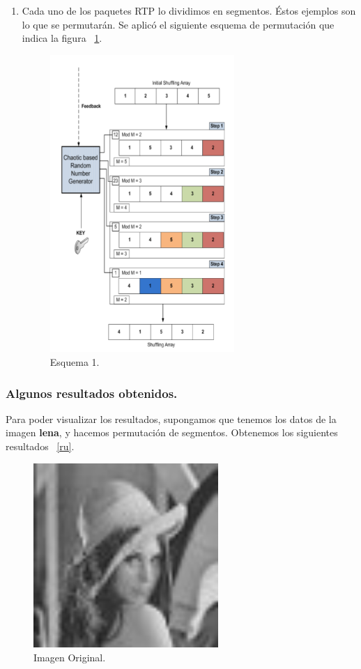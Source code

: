 \documentclass[10pt]{IEEEtran}
\begin{document}
\begin{enumerate}
\item Cada uno de los paquetes RTP  lo dividimos en segmentos. Éstos ejemplos son lo que se permutarán. Se aplicó el siguiente esquema de permutación que indica la figura  ~\ref{kaa}.

\begin{figure}[H]
\centering
\includegraphics[width=7cm]{per.png}
\caption{Esquema 1.}
\label{kaa}
\end{figure}

\end{enumerate}

\subsubsection{Algunos resultados obtenidos.}
Para poder visualizar los resultados, supongamos que tenemos los datos de la imagen \textbf{lena}, y hacemos permutación de segmentos. Obtenemos los siguientes resultados ~\ref{ru}.


\begin{figure}[H]
\centering
\includegraphics[width=7cm]{lena.jpg}
\caption{Imagen Original.}
\label{ras}
\end{figure}
\end{document}
